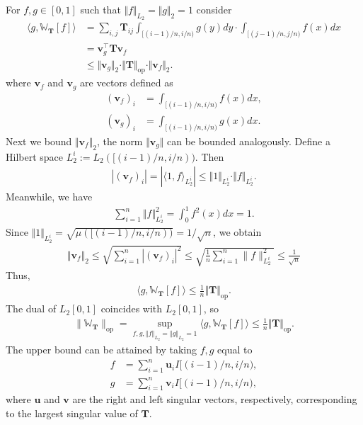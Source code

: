 \documentclass[11pt]{article}
\newcommand{\op}{\mathrm{op}}
\newcommand{\bu}{\bm{u}}
\newcommand{\bv}{\bm{v}}
\newcommand{\opnorm}[1]{\|#1\|_{\mathrm{op}}}
\newcommand{\bbW}{\mathbb{W}}
\newcommand{\bT}{\bm{T}}
\newcommand{\<}{\langle}
\renewcommand{\>}{\rangle}
\theoremstyle{plain}
\theoremstyle{definition}
\theoremstyle{remark}
\begin{document}
{For $f, g \in [0, 1]$ such that $\Vert f \Vert_{L_2} = \Vert g \Vert_2 = 1$ consider
\begin{align*}
	\langle g, \bbW_{\bT}[f] \rangle & = \sum_{i, j} \bT_{ij} \int_{[(i - 1)/n, i/n)} g(y) dy \cdot \int_{[(j - 1)/n, j/n)} f(x) dx \\ 
	& = \bv^\top_g \bT \bv_f \\
	& \le \Vert \bv_g \Vert_2 \cdot \Vert \bT \Vert_{\op} \cdot \Vert \bv_f \Vert_2.
\end{align*}
where $\bv_f$ and $\bv_g$ are vectors defined as
\begin{align*}
	(\bv_f)_i & = \int_{[(i - 1)/n, i/n)} f(x) dx, \\
	(\bv_g)_i & = \int_{[(i - 1)/n, i/n)} g(x) dx.
\end{align*}
Next we bound $\Vert \bv_f \Vert_2$, the norm $\Vert \bv_g \Vert$ can be bounded analogously. Define a Hilbert space $L_2^i := L_2 ([(i - 1)/n, i/n))$. Then
\begin{align*}
	|(\bv_f)_i| = |\langle 1, f \rangle_{L_2^i} | \le \Vert 1 \Vert_{L_2^i} \cdot \Vert f \Vert_{L_2^i}.
\end{align*}
Meanwhile, we have
\begin{align*}
	\sum_{i = 1}^n \Vert f \Vert_{L_2^i}^2 = \int_0^1 f^2(x) dx = 1.
\end{align*}
Since $\Vert 1 \Vert_{L_2^i} = \sqrt{\mu ([(i - 1)/n, i/n))} = 1/\sqrt{n}$, we obtain 
\begin{align*}
    \Vert \bv_f \Vert_2 \leq \sqrt{\sum_{i = 1}^n |(\bv_f)_i|^2} \leq \sqrt{ \frac{1}{n} \sum_{i = 1}^n \|f\|^2_{L_2^i}} \le \frac{1}{\sqrt{n}}
\end{align*}
Thus,
\begin{align*}
	\langle g, \bbW_{\bT}[f] \rangle \le \frac{1}{n} \Vert \bT \Vert_{\op}.
\end{align*}
The dual of $L_2[0, 1]$ coincides with $L_2[0, 1]$, so 
\begin{align*}
	\opnorm{\bbW_{\bT}} = \sup_{f, g, \Vert f \Vert_{L_2} = \Vert g \Vert_{L_2} = 1} 
	\langle g, \bbW_{\bT} [f] \rangle \le \frac{1}{n} \Vert \bT \Vert_{\op}.
\end{align*}
The upper bound can be attained by taking $f, g$ equal to
\begin{align*}
	f & = \sum_{i = 1}^n \bu_i I{[(i - 1)/n, i/n)}, \\
	g & = \sum_{i = 1}^n \bv_i I{[(i - 1)/n, i/n)},
\end{align*} 
where $\bu$ and $\bv$ are the right and left singular vectors, respectively, corresponding to the largest singular value of $\bT$.

}
\end{document}
